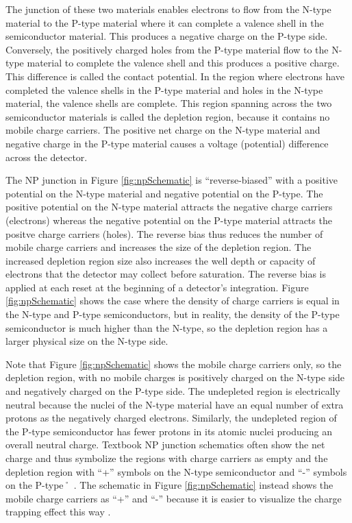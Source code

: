 \documentclass{aastex62}
\begin{document}
The junction of these two materials enables electrons to flow from the N-type material to the P-type material where it can complete a valence shell in the semiconductor material.
This produces a negative charge on the P-type side.
Conversely, the positively charged holes from the P-type material flow to the N-type material to complete the valence shell and this produces a positive charge.
This difference is called the contact potential.
In the region where electrons have completed the valence shells in the P-type material and holes in the N-type material, the valence shells are complete.
This region spanning across the two semiconductor materials is called the depletion region, because it contains no mobile charge carriers.
The positive net charge on the N-type material and negative charge in the P-type material causes a voltage (potential) difference across the detector.

The NP junction in Figure \ref{fig:npSchematic} is ``reverse-biased'' with a positive potential on the N-type material and negative potential on the P-type.
The positive potential on the N-type material attracts the negative charge carriers (electrons) whereas the negative potential on the P-type material attracts the  positve charge carriers (holes).
The reverse bias thus reduces the number of mobile charge carriers and increases the size of the depletion region.
The increased depletion region size also increases the well depth or capacity of electrons that the detector may collect before saturation.
The reverse bias is applied at each reset at the beginning of a detector's integration.
Figure \ref{fig:npSchematic} shows the case where the density of charge carriers is equal in the N-type and P-type semiconductors, but in reality, the density of the P-type semiconductor is much higher than the N-type, so the depletion region has a larger physical size on the N-type side.

Note that Figure \ref{fig:npSchematic} shows the mobile charge carriers only, so the depletion region, with no mobile charges is positively charged on the N-type side and negatively charged on the P-type side.
The undepleted region is electrically neutral because the nuclei of the N-type material have an equal number of extra protons as the negatively charged electrons.
Similarly, the undepleted region of the P-type semiconductor has fewer protons in its atomic nuclei producing an overall neutral charge.
Textbook NP junction schematics often show the net charge and thus symbolize the regions with charge carriers as empty and the depletion region with ``+'' symbols on the N-type semiconductor and ``-'' symbols on the P-type˚ \citep[e.g.][]{halliday2004physicsText}.
The schematic in Figure \ref{fig:npSchematic} instead shows the mobile charge carriers as ``+'' and ``-'' because it is easier to visualize the charge trapping effect this way \citep[e.g.][]{smith2008imgPersistence}.
\end{document}
